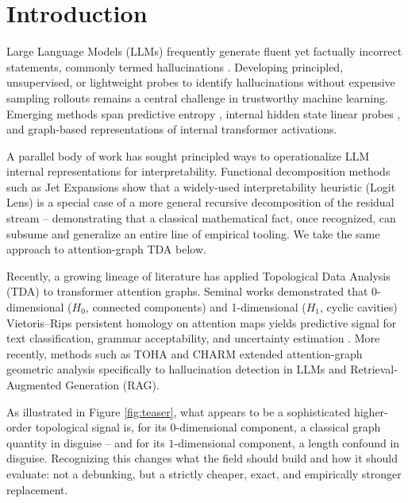 \documentclass{article}
\begin{document}
\section{Introduction}
Large Language Models (LLMs) frequently generate fluent yet factually incorrect statements, commonly termed hallucinations \citep{huang2023survey, ji2023survey}. Developing principled, unsupervised, or lightweight probes to identify hallucinations without expensive sampling rollouts remains a central challenge in trustworthy machine learning. Emerging methods span predictive entropy \citep{farquhar2024semantic}, internal hidden state linear probes \citep{azaria2023internal, chuang2024lookback}, and graph-based representations of internal transformer activations.

A parallel body of work has sought principled ways to operationalize LLM internal representations for interpretability. Functional decomposition methods such as Jet Expansions \citep{chen2026jets} show that a widely-used interpretability heuristic (Logit Lens) is a special case of a more general recursive decomposition of the residual stream -- demonstrating that a classical mathematical fact, once recognized, can subsume and generalize an entire line of empirical tooling. We take the same approach to attention-graph TDA below.

Recently, a growing lineage of literature has applied Topological Data Analysis (TDA) to transformer attention graphs. Seminal works demonstrated that 0-dimensional ($H_0$, connected components) and 1-dimensional ($H_1$, cyclic cavities) Vietoris--Rips persistent homology on attention maps yields predictive signal for text classification, grammar acceptability, and uncertainty estimation \citep{kushnareva2021, cherniavskii2022, kostenok2023}. More recently, methods such as TOHA \citep{toha} and CHARM \citep{charm} extended attention-graph geometric analysis specifically to hallucination detection in LLMs and Retrieval-Augmented Generation (RAG).

As illustrated in Figure \ref{fig:teaser}, what appears to be a sophisticated higher-order topological signal is, for its $0$-dimensional component, a classical graph quantity in disguise -- and for its $1$-dimensional component, a length confound in disguise. Recognizing this changes what the field should build and how it should evaluate: not a debunking, but a strictly cheaper, exact, and empirically stronger replacement.
\end{document}
